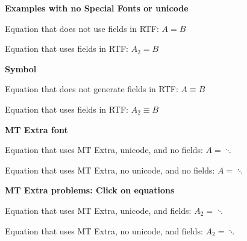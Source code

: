 \documentclass{article}
\begin{document}
\textbf{Examples with no Special Fonts or unicode}

Equation that does not use fields in RTF: $A = B$

Equation that uses fields in RTF: $A_2 = B$

\textbf{Symbol}

Equation that does not generate fields in RTF: $A\equiv B$

Equation that uses fields in RTF: $A_2 \equiv B$

\textbf{MT Extra font}

Equation that uses MT Extra, unicode, and no fields: $A = \ddots$

Equation that uses MT Extra, no unicode, and no fields: $A = \ddots$

\textbf{MT Extra problems:  Click on equations}

Equation that uses MT Extra, unicode, and fields: $A_2 = \ddots$

Equation that uses MT Extra, no unicode, and fields: $A_2 = \ddots$
\end{document}
